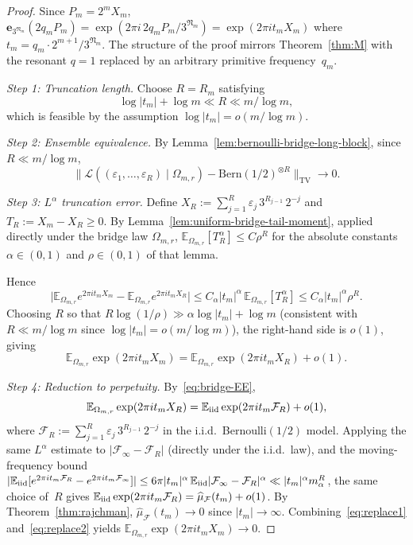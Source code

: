 \documentclass[11pt,a4paper]{amsart}
\theoremstyle{plain}
\theoremstyle{definition}
\newcommand{\E}{\mathbb{E}}
\newcommand{\TV}{\mathrm{TV}}
\begin{document}
\begin{proof}
Since $P_m=2^m X_m$,
$\mathbf e_{3^{\mathfrak N_m}}(2q_mP_m)=\exp(2\pi i\,2q_m P_m/3^{\mathfrak N_m})=\exp(2\pi i t_m X_m)$
where $t_m=q_m\cdot 2^{m+1}/3^{\mathfrak N_m}$.
The structure of the proof mirrors Theorem~\ref{thm:M} with the resonant
$q=1$ replaced by an arbitrary primitive frequency~$q_m$.

\emph{Step 1: Truncation length.}
Choose $R=R_m$ satisfying
\begin{equation}\label{eq:Rsubexp}
\log|t_m|+\log m\ll R\ll m/\log m,
\end{equation}
which is feasible by the assumption $\log|t_m|=o(m/\log m)$.

\emph{Step 2: Ensemble equivalence.}
By Lemma~\ref{lem:bernoulli-bridge-long-block}, since $R\ll m/\log m$,
\begin{equation}\label{eq:bridge-EE}
\bigl\|\mathcal L((\varepsilon_1,\dots,\varepsilon_R)\mid\Omega_{m,r})
-\mathrm{Bern}(1/2)^{\otimes R}\bigr\|_{\TV}\to 0.
\end{equation}

\emph{Step 3: $L^\alpha$ truncation error.}
Define $X_R:=\sum_{j=1}^R\varepsilon_j\,3^{R_{j-1}}\,2^{-j}$ and
$T_R:=X_m-X_R\ge 0$.
By Lemma~\ref{lem:uniform-bridge-tail-moment}, applied directly under the
bridge law $\Omega_{m,r}$,
$\E_{\Omega_{m,r}}[T_R^\alpha]\le C\rho^R$
for the absolute constants $\alpha\in(0,1)$ and $\rho\in(0,1)$ of that lemma.

Hence
\begin{equation}\label{eq:Pphasealpha}
\bigl|\E_{\Omega_{m,r}}e^{2\pi i t_m X_m}-\E_{\Omega_{m,r}}e^{2\pi i t_m X_R}\bigr|
\le C_\alpha|t_m|^\alpha\,\E_{\Omega_{m,r}}[T_R^\alpha]
\le C_\alpha|t_m|^\alpha\rho^R.
\end{equation}
Choosing $R$ so that $R\log(1/\rho)\gg\alpha\log|t_m|+\log m$
(consistent with $R\ll m/\log m$ since $\log|t_m|=o(m/\log m)$),
the right-hand side is $o(1)$, giving
\begin{equation}\label{eq:replace1}
\E_{\Omega_{m,r}}\exp(2\pi i t_m X_m)=\E_{\Omega_{m,r}}\exp(2\pi i t_m X_R)+o(1).
\end{equation}

\emph{Step 4: Reduction to perpetuity.}
By~\eqref{eq:bridge-EE},
\begin{equation}\label{eq:replace2}
\E_{\Omega_{m,r}}\exp(2\pi i t_m X_R)=\E_{\rm iid}\exp(2\pi i t_m\mathcal F_R)+o(1),
\end{equation}
where $\mathcal F_R:=\sum_{j=1}^R\varepsilon_j\,3^{R_{j-1}}\,2^{-j}$ in the
i.i.d.\ Bernoulli$(1/2)$ model.
Applying the same $L^\alpha$ estimate to $|\mathcal F_\infty-\mathcal F_R|$
(directly under the i.i.d.\ law), and the moving-frequency bound
$|\E_{\rm iid}[e^{2\pi it_m\mathcal F_R}-e^{2\pi it_m\mathcal F_\infty}]|
\le 6\pi|t_m|^\alpha\,\E_{\rm iid}|\mathcal F_\infty-\mathcal F_R|^\alpha
\ll|t_m|^\alpha m_\alpha^R$,
the same choice of~$R$ gives
$\E_{\rm iid}\exp(2\pi it_m\mathcal F_R)=\widehat\mu_{\mathcal F}(t_m)+o(1)$.
By Theorem~\ref{thm:rajchman}, $\widehat\mu_{\mathcal F}(t_m)\to 0$ since
$|t_m|\to\infty$.
Combining~\eqref{eq:replace1} and~\eqref{eq:replace2} yields
$\E_{\Omega_{m,r}}\exp(2\pi i t_m X_m)\to 0$.
\end{proof}
\end{document}
